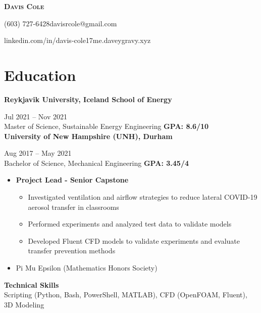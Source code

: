 \documentclass{my_resume}
\begin{document}
\begingroup
    \hfil{\huge{\textbf{\scshape{Davis Cole}}}}\hfil
\endgroup

\begingroup
    \hfil(603) 727-6428\addressSep davisrcole@gmail.com\hfil

    \hfil linkedin.com/in/davis-cole17\addressSep me.daveygravy.xyz
\endgroup

\vspace{-1.25em}
\section{Education}
\vspace{-0.25em}
{\textbf{Reykjavik University, Iceland School of Energy}}\hfill\raggedright{Jul 2021 -- Nov 2021}
\\ {Master of Science, Sustainable Energy Engineering \hfill{\textbf{GPA: 8.6/10}}} \\
\smallskip
{\textbf{University of New Hampshire (UNH), Durham}}\hfill\raggedright{Aug 2017 -- May 2021}
\\Bachelor of Science, Mechanical Engineering \hfill{\textbf{GPA: 3.45/4}}
\begin{itemize}[label={\tiny\raisebox{1ex}{\textbullet}}, noitemsep, leftmargin=0.75cm]
    \item \textbf{Project Lead - Senior Capstone}
    \begin{itemize}[label={\tiny\raisebox{1ex}{\textbullet}}, noitemsep, leftmargin=0.75cm]
        \item Investigated ventilation and airflow strategies to reduce lateral COVID-19 aerosol transfer in classrooms
        \item Performed experiments and analyzed test data to validate models
        \item Developed Fluent CFD models to validate experiments and evaluate transfer prevention methods
    \end{itemize}
    \item Pi Mu Epsilon (Mathematics Honors Society)
\end{itemize}
\smallskip
\textbf{Technical Skills} \\
Scripting (Python, Bash, PowerShell, MATLAB), CFD (OpenFOAM, Fluent), 3D Modeling
\vspace{-1.25em}
\end{document}
